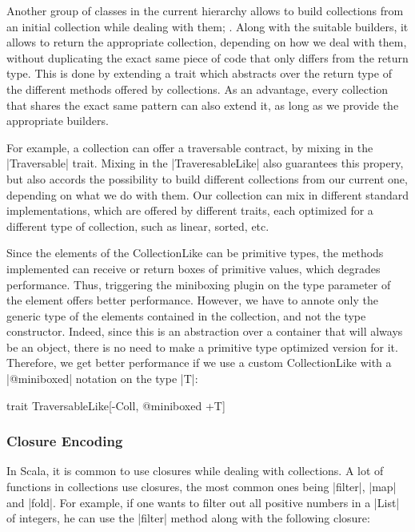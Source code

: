 Another group of classes in the current hierarchy allows to build collections from an initial collection while dealing with them; . Along with the suitable builders, it allows to return the appropriate collection, depending on how we deal with them, without duplicating the exact same piece of code that only differs from the return type. This is done by extending a trait which abstracts over the return type of the different methods offered by collections. As an advantage, every collection that shares the exact same pattern can also extend it, as long as we provide the appropriate builders.

For example, a collection can offer a traversable contract, by mixing in the |Traversable| trait. Mixing in the |TraveresableLike| also guarantees this propery, but also accords the possibility to build different collections from our current one, depending on what we do with them. Our collection can mix in different standard implementations, which are offered by different traits, each optimized for a different type of collection, such as linear, sorted, etc.

Since the elements of the CollectionLike can be primitive types, the methods implemented can receive or return boxes of primitive values, which degrades performance. Thus, triggering the miniboxing plugin on the type parameter of the element offers better performance. However, we have to annote only the generic type of the elements contained in the collection, and not the type constructor. Indeed, since this is an abstraction over a container that will always be an object, there is no need to make a primitive type optimized version for it. Therefore, we get better performance if we use a custom CollectionLike with a |@miniboxed| notation on the type |T|:

\begin{lstlisting-nobreak}
 trait TraversableLike[-Coll, @miniboxed +T]
\end{lstlisting-nobreak}

\subsubsection{Closure Encoding}

In Scala, it is common to use closures while dealing with collections. A lot of functions in collections use closures, the most common ones being |filter|, |map| and |fold|. For example, if one wants to filter out all positive numbers in a |List| of integers, he can use the |filter| method along with the following closure:

